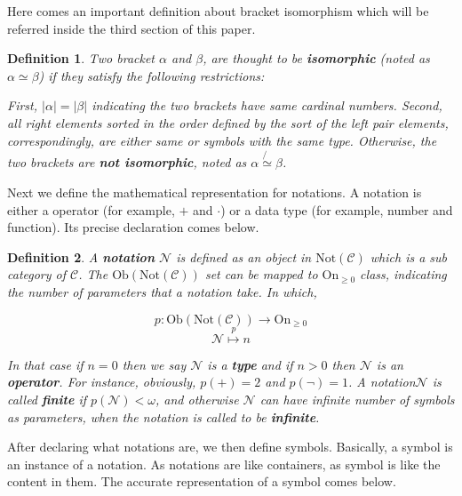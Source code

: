 \documentclass{article}
\newtheorem{definition}{Definition}
\begin{document}
Here comes an important definition about bracket isomorphism which will be referred inside the third section of this paper.

\begin{definition}
	Two bracket \(\alpha\) and \(\beta\), are thought to be \textbf{ isomorphic} (noted as \(\alpha \simeq \beta\)) if they satisfy the following restrictions:
	
	First, \(|\alpha |=|\beta |\) indicating the two brackets have same cardinal numbers. Second, all right elements sorted in the order defined by the sort of the left pair elements, correspondingly, are either same or symbols with the same type. Otherwise, the two brackets are \textbf{ not isomorphic}, noted as \(\alpha \not{\simeq}\beta\).
\end{definition}

Next we define the mathematical representation for notations. A notation is either a operator (for example, \(+\) and \(\cdot\)) or a data type (for example, number and function). Its precise declaration comes below.

\begin{definition}
	A \textbf{ notation} \(\mathcal{N}\) is defined as an object in \(\text{Not}(\mathcal{C})\) which is a sub category of \(\mathcal{C}\). The \(\text{Ob}(\text{Not}(\mathcal{C}))\) set can be mapped to \(\text{On}_{\geq 0}\) class, indicating the number of parameters that a notation take. In which,
	
	\[\mathit{p}:\text{Ob}(\text{Not}(\mathcal{C}))\to \text{On}_{\geq 0}\]
	\[\mathcal{N}\overset{\mathit{p}}{\mapsto }n\]
	
	In that case if \(n=0\) then we say \(\mathcal{N}\) is a \textbf{ type} and if \(n>0\) then \(\mathcal{N}\) is an \textbf{ operator}. For instance, obviously, \(\mathit{p}(+)=2\) and \(\mathit{p}(\neg )=1\). A notation\(\mathcal{N}\) is called \textbf{ finite} if \(\mathit{p}(\mathcal{N})<\omega\), and otherwise \(\mathcal{N}\) can have infinite number of symbols as parameters, when the notation is called to be \textbf{ infinite}.
\end{definition}

After declaring what notations are, we then define symbols. Basically, a symbol is an instance of a notation. As notations are like containers, as symbol is like the content in them. The accurate representation of a symbol comes below.
\end{document}
